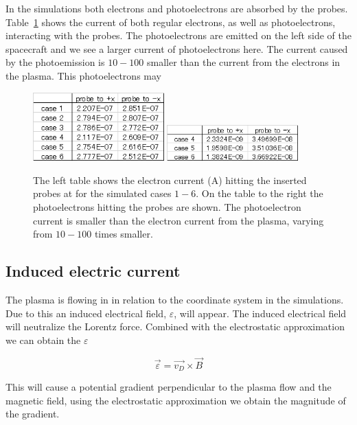 In the simulations both electrons and photoelectrons are absorbed by the probes. Table~\ref{tab:elec_current} shows the current
of both regular electrons, as well as photoelectrons, interacting with the probes.
The photoelectrons are emitted on the left side of the spacecraft and we see a larger current of
photoelectrons here. The current caused by the photoemission is \(10-100\) smaller than the current
from the electrons in the plasma. This photoelectrons may

\begin{figure}[h]
	\includegraphics[width = 0.45\textwidth]{images/caliculation_of_electron_current}
	\includegraphics[width = 0.45\textwidth]{images/caliculation_of_PE_current}
	\caption{The left table shows the electron current (A) hitting the inserted probes at
	for the simulated cases \(1-6\). On the table to the right the photoelectrons hitting the probes are shown.
	The photoelectron current is smaller than the electron current from the plasma, varying from \(10-100\) times smaller.}
	\label{tab:elec_current}
\end{figure}



\subsection{Induced electric current}
	The plasma is flowing in in relation to the coordinate system in the simulations.
	Due to this an induced electrical field, \(\varepsilon\), will appear.
	The induced electrical field will neutralize the Lorentz force.
	Combined with the electrostatic approximation we can obtain the \(\varepsilon\)

	\begin{equation}
		\vec{\varepsilon} = \vec{v_D}\times \vec{B}
	\end{equation}

	This will cause a potential gradient perpendicular to the plasma flow and the magnetic field,
	using the electrostatic approximation we obtain the magnitude of the gradient.

